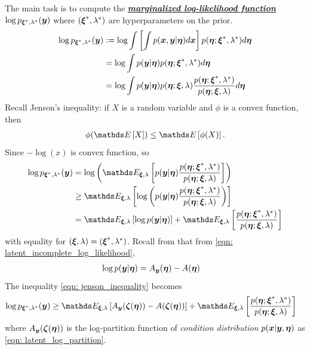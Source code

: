 \documentclass[11pt]{article}
\begin{document}
The main task is to compute the \underline{\emph{\textbf{marginalized log-likelihood function}}} $\log p_{\boldsymbol{\xi}^{*}, \lambda^{*}}(\boldsymbol{y})$ where $(\boldsymbol{\xi}^{*}, \lambda^{*})$ are hyperparameters on the prior.
\begin{align}
\log p_{\boldsymbol{\xi}^{*}, \lambda^{*}}(\boldsymbol{y}) &:= \log \int  \left[\int p(\boldsymbol{x}, \boldsymbol{y}| \boldsymbol{\eta})  d\boldsymbol{x}\right] p(\boldsymbol{\eta}; \boldsymbol{\xi}^{*}, \lambda^{*}) d\boldsymbol{\eta} \nonumber\\
&= \log \int p(\boldsymbol{y}| \boldsymbol{\eta}) p(\boldsymbol{\eta}; \boldsymbol{\xi}^{*}, \lambda^{*}) d\boldsymbol{\eta} \label{eqn: var_bayes_marginal_likelihood} \\
&= \log \int p(\boldsymbol{y}| \boldsymbol{\eta}) p(\boldsymbol{\eta}; \boldsymbol{\xi}, \lambda) \frac{p(\boldsymbol{\eta}; \boldsymbol{\xi}^{*}, \lambda^{*})}{p(\boldsymbol{\eta}; \boldsymbol{\xi}, \lambda)} d\boldsymbol{\eta} \nonumber
\end{align}
Recall Jenson's inequality:  if $X$ is a random variable and $\phi$ is a convex function, then
\begin{align*}
 \phi(\E{}{X}) \le \E{}{\phi(X)}.
\end{align*} Since $-\log(x)$ is convex function, so 
\begin{align}
\log p_{\mb{\xi}^{*}, \lambda^{*}}(\mb{y}) &= \log\paren{\E{\mb{\xi}, \lambda}{p(\mb{y}| \mb{\eta})\frac{p(\mb{\eta}; \mb{\xi}^{*}, \lambda^{*})}{p(\mb{\eta}; \mb{\xi}, \lambda)}  }} \nonumber\\
&\ge \E{\mb{\xi}, \lambda}{ \log\paren{ p(\mb{y}| \mb{\eta})\frac{p(\mb{\eta}; \mb{\xi}^{*}, \lambda^{*})}{p(\mb{\eta}; \mb{\xi}, \lambda)}  }} \nonumber\\
&= \E{\mb{\xi}, \lambda}{\log p(\mb{y}| \mb{\eta}) } + \E{\mb{\xi}, \lambda}{\frac{p(\mb{\eta}; \mb{\xi}^{*}, \lambda^{*})}{p(\mb{\eta}; \mb{\xi}, \lambda)} } \label{eqn: jenson_inequality}
\end{align} with equality for $(\boldsymbol{\xi}, \lambda) = (\boldsymbol{\xi}^{*}, \lambda^{*})$. Recall from that from \eqref{eqn: latent_incomplete_log_likelihood}, 
\begin{align*}
\log p(\boldsymbol{y}| \boldsymbol{\eta}) &= A_{\boldsymbol{y}}(\boldsymbol{\eta})  - A(\boldsymbol{\eta})
\end{align*} The inequality \eqref{eqn: jenson_inequality} becomes
\begin{align}
\log p_{\mb{\xi}^{*}, \lambda^{*}}(\mb{y}) &\ge  \E{\mb{\xi}, \lambda}{A_{\mb{y}}(\mb{\zeta}(\mb{\eta}))  - A(\mb{\zeta}(\mb{\eta})) }  + \E{\mb{\xi}, \lambda}{\frac{p(\mb{\eta}; \mb{\xi}^{*}, \lambda^{*})}{p(\mb{\eta}; \mb{\xi}, \lambda)} } \label{eqn: var_bayes_lower_bound}
\end{align} where $A_{\boldsymbol{y}}(\boldsymbol{\zeta}(\boldsymbol{\eta}))$ is the log-partition function of \emph{condition distribution} $p(\boldsymbol{x}|\boldsymbol{y}, \boldsymbol{\eta})$ as \eqref{eqn: latent_log_partition}.
\end{document}
